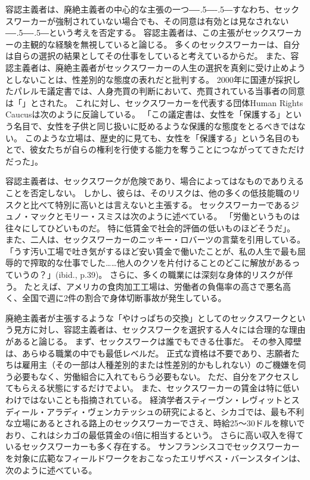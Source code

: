 \documentclass[paper=a4,book,openany]{jlreq}
\newcommand{\ig}[1]{}           %
\def\DDASH{―\kern-.5\zw―\kern-.5\zw―} %
\begin{document}
容認主義者は、廃絶主義者の中心的な主張の一つ{\DDASH}すなわち、セックスワーカーが強制されていない場合でも、その同意は有効とは見なされない{\DDASH}という考えを否定する。
容認主義者は、この主張がセックスワーカーの主観的な経験を無視していると論じる。
多くのセックスワーカーは、自分は自らの選択の結果としてその仕事をしていると考えているからだ。
また、容認主義者は、廃絶主義者がセックスワーカーの人生の選択を真剣に受け止めようとしないことは、性差別的な態度の表れだと批判する。
2000年に国連が採択したパレルモ議定書では、人身売買の判断において、売買されている当事者の同意は「」とされた。
これに対し、セックスワーカーを代表する団体Human Rights Caucusは次のように反論している。
「この議定書は、女性を「保護する」という名目で、女性を子供と同じ扱いに貶めるような保護的な態度をとるべきではない。
このような立場は、歴史的に見ても、女性を「保護する」という名目のもとで、彼女たちが自らの権利を行使する能力を奪うことにつながっててきただけだった」\citep{caucus99:_recom_commen_draft_protoc_combat}。

容認主義者は、セックスワークが危険であり、場合によってはなものでありえることを否定しない。
しかし、彼らは、そのリスクは、他の多くの低技能職のリスクと比べて特別に高いとは言えないと主張する。
セックスワーカーであるジュノ・マックとモリー・スミスは次のように述べている。
「労働というものは往々にしてひどいものだ。
特に低賃金で社会的評価の低いものほどそうだ」\citep[p.43]{mac18:_revol_prost}。
また、二人は、セックスワーカーのニッキー・ロバーツ\ig{Nickie Roberts}の言葉を引用している。
「うす汚い工場で吐き気がするほど安い賃金で働いたことが、私の人生で最も屈辱的で搾取的な仕事でした……他人のクソを片付けることのどこに解放があるっていうの？」(ibid., p.39)。
さらに、多くの職業には深刻な身体的リスクが伴う。
たとえば、アメリカの食肉加工工場は、労働者の負傷率の高さで悪名高く、全国で週に2件の割合で身体切断事故が発生している\citep{wasley18:_two_amput_week}。

廃絶主義者が主張するような「やけっぱちの交換」としてのセックスワークという見方に対し、容認主義者は、セックスワークを選択する人々には合理的な理由があると論じる。
まず、セックスワークは誰でもできる仕事だ。
その参入障壁は、あらゆる職業の中でも最低レベルだ。
正式な資格は不要であり、志願者たちは雇用主（その一部は人種差別的または性差別的かもしれない）のご機嫌を伺う必要もなく、労働組合に入れてもらう必要もない。
ただ、自分をアクセスしてもらえる状態にするだけでよい。
また、セックスワーカーの賃金は特に低いわけではないことも指摘されている。
経済学者スティーヴン・レヴィットとスディール・アラディ・ヴェンカテッシュの研究によると、シカゴでは、最も不利な立場にあるとされる路上のセックスワーカーでさえ、時給25～30ドルを稼いでおり、これはシカゴの最低賃金の4倍に相当するという\citep[p.26]{levitt07:_empir_analy_street_level_prost}。
さらに高い収入を得ているセックスワーカーも多く存在する。
サンフランシスコでセックスワーカーを対象に広範なフィールドワークをおこなったエリザベス・バーンスタインは、次のように述べている。
\end{document}
